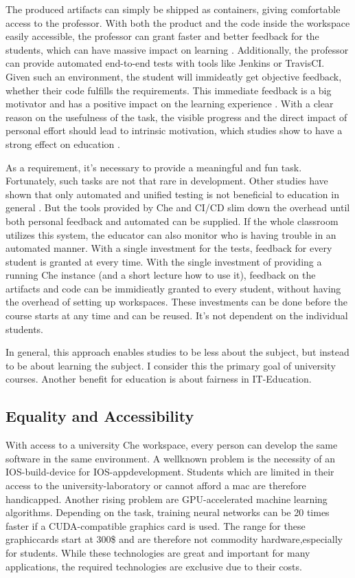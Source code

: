\documentclass[utf8]{lni}
\begin{document}
The produced artifacts can simply be shipped as containers, giving comfortable access to the professor. 
With both the product and the code inside the workspace easily accessible, the professor can grant faster and better feedback for the students, which can have massive impact on learning \cite{HU95}\cite{HU18}.
Additionally, the professor can provide automated end-to-end tests with tools like Jenkins or TravisCI. 
Given such an environment, the student will immideatly get objective feedback, whether their code fulfills the requirements. 
This immediate feedback is a big motivator and has a positive impact on the learning experience \cite{FI05}. 
With a clear reason on the usefulness of the task, the visible progress and the direct impact of personal effort should lead to intrinsic motivation, which studies show to have a strong effect on education \cite{DECI93}. 

As a requirement, it's necessary to provide a meaningful and fun task. 
Fortunately, such tasks are not that rare in development.  
Other studies have shown that only automated and unified testing is not beneficial to education in general \cite{TC88}. 
But the tools provided by Che and CI/CD slim down the overhead until both personal feedback and automated can be supplied. 
If the whole classroom utilizes this system, the educator can also monitor who is having trouble in an automated manner. 
With a single investment for the tests, feedback for every student is granted at every time. 
With the single investment of providing a running Che instance (and a short lecture how to use it), feedback on the artifacts and code can be immidieatly granted to every student, without having the overhead of setting up workspaces. 
These investments can be done before the course starts at any time and can be reused.
It's not dependent on the individual students. 

In general, this approach enables studies to be less about the subject, but instead to be about learning the subject. 
I consider this the primary goal of university courses. 
Another benefit for education is about fairness in IT-Education.  

\subsection{Equality and Accessibility}
With access to a university Che workspace, every person can develop the same software in the same environment. 
A wellknown problem is the necessity of an IOS-build-device for IOS-appdevelopment.
Students which are limited in their access to the university-laboratory or cannot afford a mac are therefore handicapped.
Another  rising  problem  are  GPU-accelerated  machine learning algorithms. 
Depending on the task, training neural networks can be 20 times faster if a CUDA-compatible graphics card is used. 
The range for these graphiccards start at 300\$ and are therefore not commodity hardware,especially for students.  
While these technologies are great and important for many applications, the required technologies are exclusive due to  their  costs.
\end{document}
